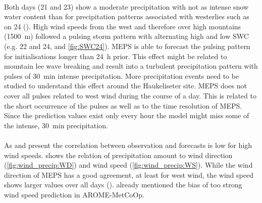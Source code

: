 \\
Both days (\num{21} and \SI{23}{\dec}) show a moderate precipitation with not as intense snow water content than for precipitation patterns associated with westerlies such as on \SI{24}{\dec} (). 
High wind speeds from the west and therefore over high mountains (\SI{1500}{\metre}) followed a pulsing storm pattern with alternating high and low SWC (e.g. \num{22} and \SI{24}{\dec},  and \ref{fig:SWC24}). MEPS is able to forecast the pulsing pattern for initialisations longer than \SI{24}{\hour} prior.
This effect might be related to mountain lee wave breaking %
and result into a turbulent precipitation pattern with pulses of \SI{30}{\minute} intense precipitation. More precipitation events need to be studied to understand this effect around the Haukeliseter site. MEPS does not cover all pulses related to west wind during the course of a day. This is related to the short occurrence of the pulses as well as to the time resolution of MEPS. %
Since the prediction values exist only every hour the model might miss some of the intense, \SI{30}{\minute} precipitation. %
\\
\\
As  and  present the correlation between observation and forecasts is low for high wind speeds.  shows the relation of precipitation amount to wind direction (\ref{fig:wind_precip:WD}) and wind speed (\ref{fig:wind_precip:WS}).
While the wind direction of MEPS has a good agreement, at least for west wind, the wind speed shows larger values over all days ().
\citet{muller_arome-metcoop:_2017} already mentioned the bias of too strong wind speed prediction in AROME-MetCoOp.%
\\
